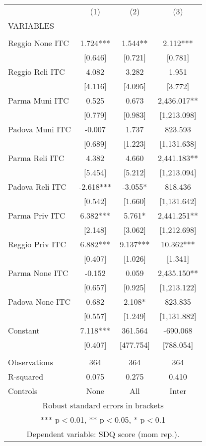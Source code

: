 \begin{tabular}{lccc} \hline
 & (1) & (2) & (3) \\
VARIABLES &  &  &  \\ \hline
 &  &  &  \\
Reggio None ITC & 1.724*** & 1.544** & 2.112*** \\
 & [0.646] & [0.721] & [0.781] \\
Reggio Reli ITC & 4.082 & 3.282 & 1.951 \\
 & [4.116] & [4.095] & [3.772] \\
Parma Muni ITC & 0.525 & 0.673 & 2,436.017** \\
 & [0.779] & [0.983] & [1,213.098] \\
Padova Muni ITC & -0.007 & 1.737 & 823.593 \\
 & [0.689] & [1.223] & [1,131.638] \\
Parma Reli ITC & 4.382 & 4.660 & 2,441.183** \\
 & [5.454] & [5.212] & [1,213.094] \\
Padova Reli ITC & -2.618*** & -3.055* & 818.436 \\
 & [0.542] & [1.660] & [1,131.642] \\
Parma Priv ITC & 6.382*** & 5.761* & 2,441.251** \\
 & [2.148] & [3.062] & [1,212.698] \\
Reggio Priv ITC & 6.882*** & 9.137*** & 10.362*** \\
 & [0.407] & [1.026] & [1.341] \\
Parma None ITC & -0.152 & 0.059 & 2,435.150** \\
 & [0.657] & [0.925] & [1,213.122] \\
Padova None ITC & 0.682 & 2.108* & 823.835 \\
 & [0.557] & [1.249] & [1,131.882] \\
Constant & 7.118*** & 361.564 & -690.068 \\
 & [0.407] & [477.754] & [788.054] \\
 &  &  &  \\
Observations & 364 & 364 & 364 \\
R-squared & 0.075 & 0.275 & 0.410 \\
 Controls & None & All & Inter \\ \hline
\multicolumn{4}{c}{ Robust standard errors in brackets} \\
\multicolumn{4}{c}{ *** p$<$0.01, ** p$<$0.05, * p$<$0.1} \\
\multicolumn{4}{c}{ Dependent variable: SDQ score (mom rep.).} \\
\end{tabular}

